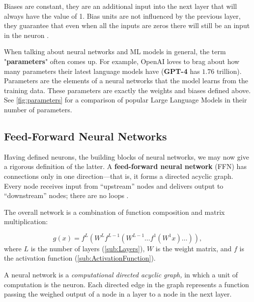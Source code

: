 \documentclass{article}
\begin{document}
\begin{definition}[Bias]\label{def:bias}
  Biases are constant, they are an additional input into the next layer that will always have the value of 1. Bias units are not influenced by the previous layer, they guarantee that even when all the inputs are zeros there will still be an input in the neuron \citep{WeightsBias}. 
\end{definition}

When talking about neural networks and ML models in general, the term "\textbf{parameters}" often comes up. For example, OpenAI loves to brag about how many parameters their latest language models have (\textbf{GPT-4} has $1.76$ trillion). Parameters are the elements of a neural networks that the model learns from the training data. These parameters are exactly the weights and biases defined above. See \autoref{fig:parameters} for a comparison of popular Large Language Models in their number of parameters.
 

\subsection{Feed-Forward Neural Networks}%
  \label{sub:Feed-Forward Neural Networks}
  Having defined neurons, the building blocks of neural networks, we may now give a rigorous definition of the latter. A \textbf{feed-forward neural network} (FFN) has connections only in one direction—that is, it forms a directed acyclic graph. Every node receives input from “upstream” nodes and delivers output to “downstream” nodes; there are no loops \citep{book:AIModernApp}.

The overall network is a combination of function composition and matrix multiplication:

  $$g(x) = f^L (W^Lf^{L-1}(W^{L-1} \hdots f^1(W^1x)\hdots)), $$
  where $L$ is the number of layers (\autoref{sub:Layers}), $W$ is the weight matrix, and $f$ is the activation function (\autoref{sub:ActivationFunction}).
 \begin{definition}
  A neural network is a \textit{computational directed acyclic graph,} in which a unit of computation is the neuron. Each directed edge in the graph represents a function passing the weighed output of a node in a layer to a node in the next layer.
 \end{definition} 
\end{document}
